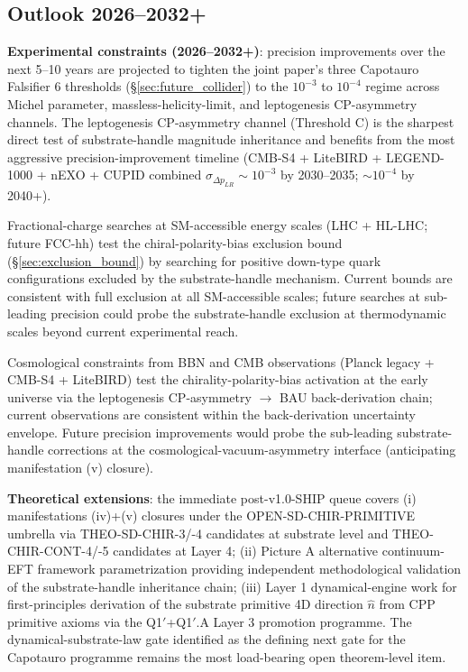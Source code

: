 \documentclass[11pt,letterpaper]{article}
\newcommand{\DeltapLR}{\Delta p_{LR}}
\begin{document}
\subsection{Outlook 2026--2032+}
\label{sec:outlook}

\textbf{Experimental constraints (2026--2032+)}: precision improvements over the next 5--10 years are projected to tighten the joint paper's three Capotauro Falsifier 6 thresholds (§\ref{sec:future_collider}) to the $10^{-3}$ to $10^{-4}$ regime across Michel parameter, massless-helicity-limit, and leptogenesis CP-asymmetry channels. The leptogenesis CP-asymmetry channel (Threshold C) is the sharpest direct test of substrate-handle magnitude inheritance and benefits from the most aggressive precision-improvement timeline (CMB-S4 + LiteBIRD + LEGEND-1000 + nEXO + CUPID combined $\sigma_{\DeltapLR} \sim 10^{-3}$ by 2030--2035; $\sim 10^{-4}$ by 2040+).

Fractional-charge searches at SM-accessible energy scales (LHC + HL-LHC; future FCC-hh) test the chiral-polarity-bias exclusion bound (§\ref{sec:exclusion_bound}) by searching for positive down-type quark configurations excluded by the substrate-handle mechanism. Current bounds are consistent with full exclusion at all SM-accessible scales; future searches at sub-leading precision could probe the substrate-handle exclusion at thermodynamic scales beyond current experimental reach.

Cosmological constraints from BBN and CMB observations (Planck legacy + CMB-S4 + LiteBIRD) test the chirality-polarity-bias activation at the early universe via the leptogenesis CP-asymmetry $\to$ BAU back-derivation chain; current observations are consistent within the back-derivation uncertainty envelope. Future precision improvements would probe the sub-leading substrate-handle corrections at the cosmological-vacuum-asymmetry interface (anticipating manifestation (v) closure).

\textbf{Theoretical extensions}: the immediate post-v1.0-SHIP queue covers (i) manifestations (iv)+(v) closures under the OPEN-SD-CHIR-PRIMITIVE umbrella via THEO-SD-CHIR-3/-4 candidates at substrate level and THEO-CHIR-CONT-4/-5 candidates at Layer 4; (ii) Picture A alternative continuum-EFT framework parametrization providing independent methodological validation of the substrate-handle inheritance chain; (iii) Layer 1 dynamical-engine work for first-principles derivation of the substrate primitive 4D direction $\hat{n}$ from CPP primitive axioms via the Q1$'$+Q1$'$.A Layer 3 promotion programme. The dynamical-substrate-law gate identified as the defining next gate for the Capotauro programme remains the most load-bearing open theorem-level item.
\end{document}
